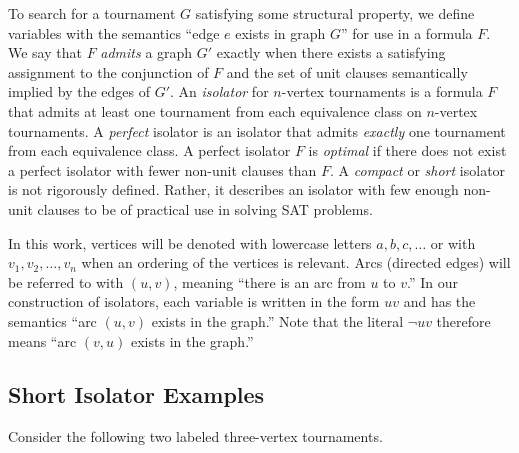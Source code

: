 \documentclass[conference]{IEEEtran}
\begin{document}
To search for a tournament $G$ satisfying some structural property, we define variables with the semantics ``edge $e$ exists in graph $G$'' for use in a formula $F$. We say that $F$ \emph{admits} a graph $G'$ exactly when there exists a satisfying assignment to the conjunction of $F$ and the set of unit clauses semantically implied by the edges of $G'$.
An \emph{isolator} for $n$-vertex tournaments is a formula $F$ that admits at least one tournament from each equivalence class on $n$-vertex tournaments.
A \emph{perfect} isolator is an isolator that admits \textit{exactly} one tournament from each equivalence class.
A perfect isolator $F$ is \emph{optimal} if there does not exist a perfect isolator with fewer non-unit clauses than $F$.
A \emph{compact} or \emph{short} isolator is not rigorously defined. Rather, it describes an isolator with few enough non-unit clauses to be of practical use in solving SAT problems.

In this work, vertices will be denoted with lowercase letters $a,b,c, \dots$ or with $v_1, v_2, \dots, v_n$ when an ordering of the vertices is relevant. Arcs (directed edges) will be referred to with $(u,v)$, meaning ``there is an arc from $u$ to $v$.'' In our construction of isolators, each variable is written in the form $uv$ and has the semantics ``arc $(u,v)$ exists in the graph.'' Note that the literal $\lnot uv$ therefore means ``arc $(v,u)$ exists in the graph.'' 


\subsection{Short Isolator Examples}
Consider the following two labeled three-vertex tournaments.

\noindent

\begin{figure}[h]
\centering
{}
\end{figure}
\end{document}
